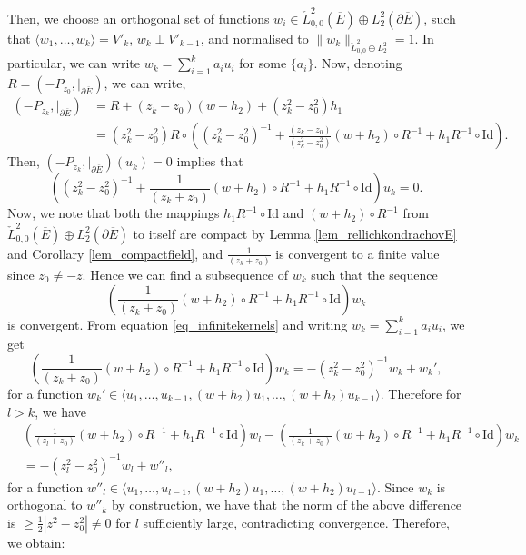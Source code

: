 \documentclass[10pt, a4paper]{article}
\theoremstyle{plain}%
\theoremstyle{definition}
\numberwithin{figure}{section}
\numberwithin{equation}{section}
\newcommand{\la}{\langle}
\newcommand{\ra}{\rangle}
\newcommand{\pa}{\partial}
\newcommand{\oE}{{\overline{E}}}
\begin{document}
Then, we choose an orthogonal set of functions $w_i\in \check{L}^2_{0,0}(\oE)\oplus L^2_{2}(\pa\oE)$, such that $\la w_1,\dots,w_k\ra = V'_k$, $w_k\perp V'_{k-1}$, and normalised to $\|w_k\|_{\check{L}^2_{0,0}\oplus L^2_{2}}=1$. In particular, we can write $w_k=\sum_{i=1}^ka_iu_i$ for some $\{a_i\}$. Now, denoting $R = (-P_{z_0},|_{\pa\oE})$, we can write, \begin{equation}\begin{split}
		(-P_{z_k},|_{\pa\oE}) &= R + (z_k-z_0)(w+h_2)+(z_k^2-z_0^2)h_1 \\
		&= (z^2_k-z_0^2)R\circ((z_k^2-z_0^2)^{-1} +\frac{(z_k-z_0)}{(z_k^{2}-z_0^2)}(w+h_2)\circ R^{-1}+h_1R^{-1}\circ \textrm{Id}). 
	\end{split}
\end{equation}
Then, $(-P_{z_k},|_{\pa\oE})(u_k)=0$ implies that \begin{equation}\label{eq_infinitekernels}
	((z_k^2-z_0^2)^{-1} +\frac{1}{(z_k+z_0)}(w+h_2)\circ R^{-1}+h_1R^{-1}\circ \textrm{Id})u_k=0.
\end{equation}
Now, we note that both the mappings $h_1R^{-1}\circ \textrm{Id}$ and $(w+h_2)\circ R^{-1}$ from $\check{L}^2_{0,0}(\oE)\oplus L^2_{2}(\pa\oE)$ to itself are compact by Lemma \ref{lem_rellichkondrachovE} and Corollary \ref{lem_compactfield}, and $\frac{1}{(z_k+z_0)}$ is convergent to a finite value since $z_0\neq -z$. Hence we can find a subsequence of $w_k$ such that the sequence\[ \left(\frac{1}{(z_k+z_0)}(w+h_2)\circ R^{-1}+h_1R^{-1}\circ \textrm{Id}\right)w_k\] is convergent. From equation \eqref{eq_infinitekernels} and writing $w_k=\sum_{i=1}^ka_iu_i$, we get \[
\left(\frac{1}{(z_k+z_0)}(w+h_2)\circ R^{-1}+h_1R^{-1}\circ \textrm{Id}\right)w_k= -(z_k^2-z_0^2)^{-1}w_k +  w_k',
\]
for a function $w_k' \in \la u_1,\dots,u_{k-1}, (w+h_2)u_1,\dots,(w+h_2)u_{k-1}\ra$. Therefore for $l >k$, we have \begin{equation}\begin{split}
&\left(\frac{1}{(z_l+z_0)}(w+h_2)\circ R^{-1}+h_1R^{-1}\circ \textrm{Id}\right)w_l - \left(\frac{1}{(z_k+z_0)}(w+h_2)\circ R^{-1}+h_1R^{-1}\circ \textrm{Id}\right)w_k \\
& = -(z_l^2-z_0^2)^{-1}w_l + w''_l,
\end{split}
\end{equation}
for a function $w''_l \in \la u_1,\dots,u_{l-1},(w+h_2)u_1,\dots,(w+h_2)u_{l-1}\ra$.
Since $w_k$ is orthogonal to $w''_k$ by construction, we have that the norm of the above difference is $\geq \frac{1}{2}|z^2-z_0^2| \neq 0$ for $l$ sufficiently large, contradicting convergence. Therefore, we obtain:
\end{document}
